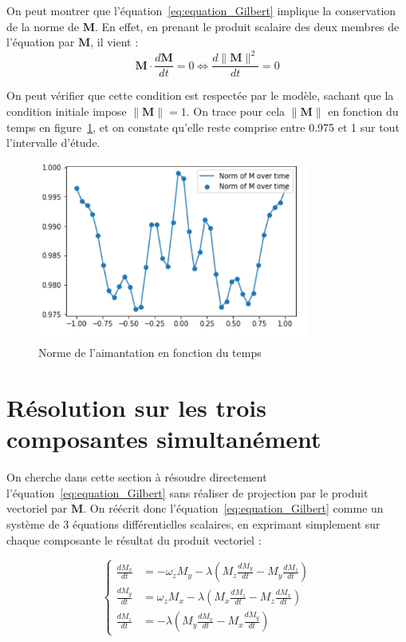 \documentclass[12pt]{report}
\begin{document}
On peut montrer que l'équation~\ref{eq:equation_Gilbert} implique la conservation de la norme de $\bm M$. 
En effet, en prenant le produit scalaire des deux membres de l'équation par $\bm M$, il vient :
\begin{equation}
    \bm{M} \cdot \frac{d\bm{M}}{dt} = 0 \Leftrightarrow 
    \frac{d\lVert \bm{M} \rVert ^2}{dt} = 0 
\label{eq:conservation_norme_M}
\end{equation}

On peut vérifier que cette condition est respectée par le modèle, sachant que la condition initiale impose $\lVert \bm{M} \rVert=1$.
On trace pour cela $\lVert \bm{M} \rVert$ en fonction du temps en figure~\ref{fig:norme_de_M}, et on constate qu'elle reste comprise entre 0.975 et 1 sur tout l'intervalle d'étude.

\begin{figure}
    \centering
    \includegraphics[width=0.8\textwidth]{norm over time.PNG}
    \caption{Norme de l'aimantation en fonction du temps}
    \label{fig:norme_de_M}
\end{figure}

\section{Résolution sur les trois composantes simultanément}

On cherche dans cette section à résoudre directement l'équation~\ref{eq:equation_Gilbert} sans réaliser de projection par le produit vectoriel par $\bm M$.
On réécrit donc l'équation~\ref{eq:equation_Gilbert} comme un système de 3 équations différentielles scalaires, en exprimant simplement sur chaque composante le résultat du produit vectoriel :

\begin{equation}
    \left\{
        \begin{aligned}
            \frac{dM_x}{dt} &=-\omega_z M_y - \lambda(M_z \frac{dM_y}{dt} - M_y \frac{dM_z}{dt}) \\
            \frac{dM_y}{dt} &= \omega_z M_x - \lambda(M_x \frac{dM_z}{dt} - M_z \frac{dM_x}{dt}) \\
            \frac{dM_z}{dt} &= - \lambda(M_y \frac{dM_x}{dt} - M_x \frac{dM_y}{dt})
        \end{aligned}
    \right.
\label{eq:projection_3_composantes}
\end{equation}
\end{document}
